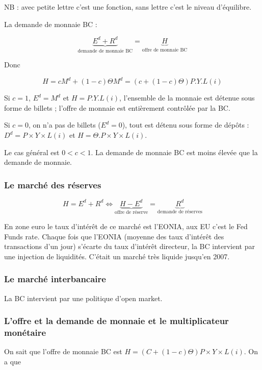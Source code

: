 	NB : avec petite lettre c'est une fonction, sans lettre c'est le niveau d'équilibre.
	
	La demande de monnaie BC :
	
	$$\underbrace{E^d + R^d}_{\text{demande de monnaie BC}} = \underbrace{H}_{\text{offre de monnaie BC}}$$
	
	Donc
	
	$$H = c M^d + (1 - c) \Theta M^d = (c + (1 - c) \Theta) P . Y . L(i)$$
	
	Si $c = 1$, $E^d = M^d$ et $H = P . Y . L(i)$, l'ensemble de la monnaie est détenue sous forme de billets ; l'offre de monnaie est entièrement contrôlée par la BC.
	
	Si $c = 0$, on n'a pas de billets ($E^d = 0$), tout est détenu sous forme de dépôts : $D^d = P\times Y\times L(i)$ et $H = \Theta . P \times  Y \times  L(i)$.
	
	Le cas général est $0 < c < 1$. La demande de monnaie BC est moins élevée que la demande de monnaie.
	
	\subsubsection{Le marché des réserves}
	
	$$H = E^d + R^d \Leftrightarrow \underbrace{H - E^d}_{\text{offre de réserve}} = \underbrace{R^d}_{\text{demande de réserves}}$$
	
	En zone euro le taux d'intérêt de ce marché est l'EONIA, aux EU c'est le Fed Funds rate. Chaque fois que l'EONIA (moyenne des taux d'intérêt des transactions d'un jour) s'écarte du taux d'intérêt directeur, la BC intervient par une injection de liquidités. C'était un marché très liquide jusqu'en 2007.
	
	
	\subsubsection{Le marché interbancaire}
	
	La BC intervient par une politique d'open market.
	
	
	\subsubsection{L'offre et la demande de monnaie et le multiplicateur monétaire}
	
	On sait que l'offre de monnaie BC est $H = (C + ( 1 - c) \Theta) P \times Y \times  L(i)$. On a que 
	
